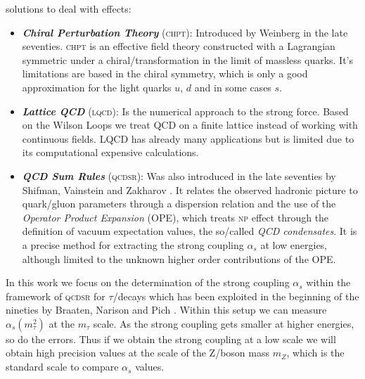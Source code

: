 \documentclass[../../index.tex]{subfiles}
\begin{document}
solutions to deal with  effects:
\begin{itemize}
\item \textbf{\textit{Chiral Perturbation Theory}}
  (\textsc{chpt}):
  Introduced by Weinberg \cite{Weinberg1978} in the late seventies.
  \textsc{chpt} is an effective field theory constructed with a Lagrangian
  symmetric under a chiral\-/transformation in the limit of massless quarks.
  It's limitations are based in the chiral symmetry, which is only a good
  approximation for the light quarks $u$, $d$ and in some cases $s$.
\item \textbf{\textit{Lattice QCD}}
  (\textsc{lqcd}): Is
    the numerical approach to the strong force. Based on the Wilson Loops
    \cite{Wilson1974} we treat QCD on a finite lattice instead of working with
    continuous fields. LQCD has already many applications but is limited due to
    its computational expensive calculations.
  \item \textbf{\textit{QCD Sum Rules}}
    (\textsc{qcdsr}): Was also introduced in the late seventies by Shifman, Vainstein
  and Zakharov \cite{Shifman1978,Shifman1978a}. It relates the observed hadronic
  picture to quark\-/gluon parameters through a dispersion relation and the use
  of the \textit{Operator Product Expansion} (OPE), which treats \textsc{np} effect
  through the definition of vacuum expectation values, the so\-/called
  \textit{QCD condensates}. It is a precise method for extracting the strong
  coupling $\alpha_s$ at low energies, although limited to the unknown higher
  order contributions of the OPE.
\end{itemize}


In this work we focus on the determination of the strong coupling $\alpha_s$
within the framework of \textsc{qcdsr} for $\tau$\-/decays which has been
exploited in the beginning of the nineties by Braaten, Narison and Pich
\cite{Braaten1991}. Within this setup we can measure $\alpha_s(m_\tau^2)$ at the
$m_\tau$ scale. As the strong coupling gets smaller at higher energies, so do
the errors. Thus if we obtain the strong coupling at a low scale we will obtain
high precision values at the scale of the Z\-/boson mass $m_Z$, which is the
standard scale to compare $\alpha_s$ values.
\end{document}
